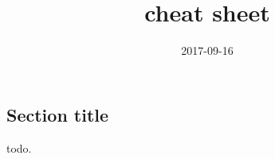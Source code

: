 \documentclass[a4paper,9pt]{extarticle}
\title{cheat sheet}
\date{2017-09-16}
\begin{document}
\begin{multicols*}{2}
    \section{Section title}
    todo.
\end{multicols*}
\end{document}
